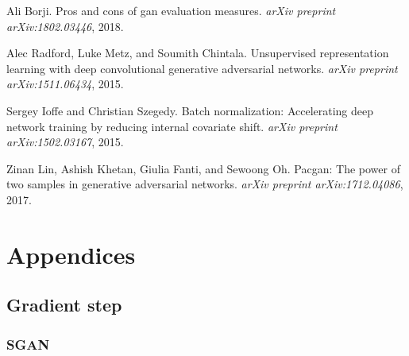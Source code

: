 \documentclass{article}
\begin{document}
\begin{thebibliography}{25}
	Ali Borji.
	\newblock Pros and cons of gan evaluation measures.
	\newblock \emph{arXiv preprint arXiv:1802.03446}, 2018.
	
	Alec Radford, Luke Metz, and Soumith Chintala.
	\newblock Unsupervised representation learning with deep convolutional
	generative adversarial networks.
	\newblock \emph{arXiv preprint arXiv:1511.06434}, 2015.
	
	Sergey Ioffe and Christian Szegedy.
	\newblock Batch normalization: Accelerating deep network training by reducing
	internal covariate shift.
	\newblock \emph{arXiv preprint arXiv:1502.03167}, 2015.
	
	Zinan Lin, Ashish Khetan, Giulia Fanti, and Sewoong Oh.
	\newblock Pacgan: The power of two samples in generative adversarial networks.
	\newblock \emph{arXiv preprint arXiv:1712.04086}, 2017.
	
\end{thebibliography}


\appendix
\section*{Appendices}
\renewcommand{\thesubsection}{\Alph{subsection}}

\subsection{Gradient step}

\subsubsection{SGAN}
\end{document}
